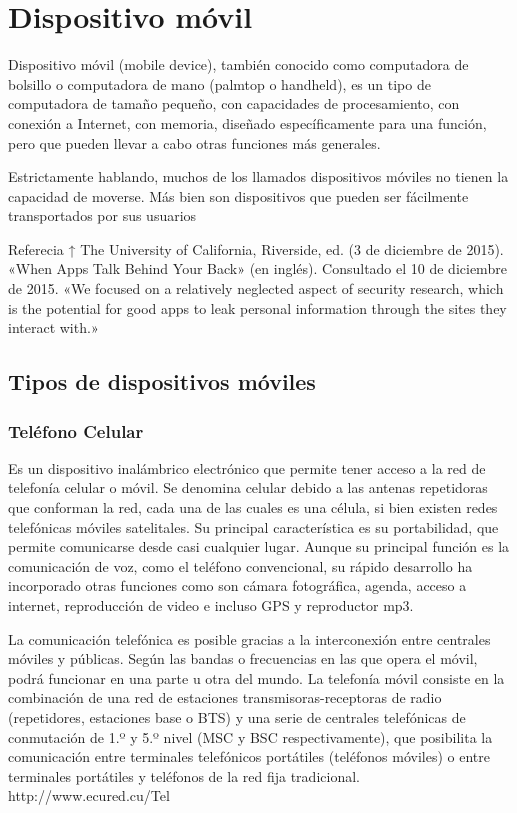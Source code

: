 \section{Dispositivo móvil}
\setlength{\parskip}{5mm}
Dispositivo móvil (mobile device), también conocido como computadora de bolsillo o computadora de mano (palmtop o handheld), es un tipo de computadora de tamaño pequeño, con capacidades de procesamiento, con conexión a Internet, con memoria, diseñado específicamente para una función, pero que pueden llevar a cabo otras funciones más generales.

Estrictamente hablando, muchos de los llamados dispositivos móviles no tienen la capacidad de moverse. Más bien son dispositivos que pueden ser fácilmente transportados por sus usuarios
\setlength{\parskip}{0mm}

Referecia
↑ The University of California, Riverside, ed. (3 de diciembre de 2015). «When Apps Talk Behind Your Back» (en inglés). Consultado el 10 de diciembre de 2015. «We focused on a relatively neglected aspect of security research, which is the potential for good apps to leak personal information through the sites they interact with.»

\subsection{Tipos de dispositivos móviles}

\subsubsection{Teléfono Celular} 
\setlength{\parskip}{5mm}
Es un dispositivo inalámbrico electrónico que permite tener acceso a la red de telefonía celular o móvil. Se denomina celular debido a las antenas repetidoras que conforman la red, cada una de las cuales es una célula, si bien existen redes telefónicas móviles satelitales. Su principal característica es su portabilidad, que permite comunicarse desde casi cualquier lugar. Aunque su principal función es la comunicación de voz, como el teléfono convencional, su rápido desarrollo ha incorporado otras funciones como son cámara fotográfica, agenda, acceso a internet, reproducción de video e incluso GPS y reproductor mp3.

La comunicación telefónica es posible gracias a la interconexión entre centrales móviles y públicas. Según las bandas o frecuencias en las que opera el móvil, podrá funcionar en una parte u otra del mundo. La telefonía móvil consiste en la combinación de una red de estaciones transmisoras-receptoras de radio (repetidores, estaciones base o BTS) y una serie de centrales telefónicas de conmutación de 1.º y 5.º nivel (MSC y BSC respectivamente), que posibilita la comunicación entre terminales telefónicos portátiles (teléfonos móviles) o entre terminales portátiles y teléfonos de la red fija tradicional.
\setlength{\parskip}{0mm}
http://www.ecured.cu/Tel%

